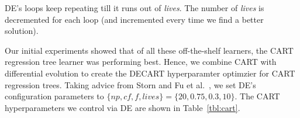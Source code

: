 \documentclass[sigconf,review,anonymous]{acmart}
\begin{document}
DE's loops keep repeating till it runs out of {\em lives}. The number of {\em lives} is decremented for each loop (and  incremented every time we find a better solution).

Our initial  experiments 
showed that of all these off-the-shelf learners, the CART regression tree learner was performing best. Hence, we combine CART with differential evolution to create the DECART hyperparamter  optimzier for CART regression trees. 
Taking advice from  Storn and Fu et al.~\cite{storn1997differential,Fu2016TuningFS}, we set DE's configuration parameters to $\{\mathit{np,cf,f,\mathit{lives}}\}=\{20,0.75,0.3,10\}$. The CART hyperparameters we control via DE are shown in Table~\ref{tbl:cart}.


 




\end{document}
